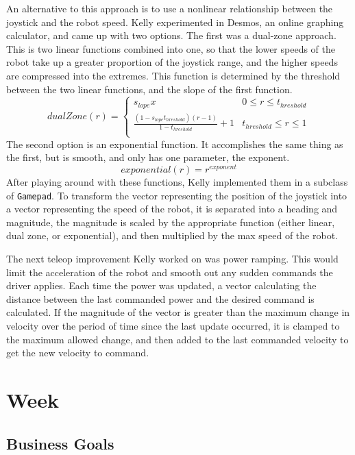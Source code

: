 \documentclass{article}
\begin{document}
An alternative to this approach is to use a nonlinear relationship between the joystick and the robot speed. Kelly experimented in Desmos, an online graphing calculator, and came up with two options. The first was a dual-zone approach. This is two linear functions combined into one, so that the lower speeds of the robot take up a greater proportion of the joystick range, and the higher speeds are compressed into the extremes. This function is determined by the threshold between the two linear functions, and the slope of the first function.
\begin{equation}
dualZone(r) = 
\begin{cases} 
      s_{lope}x & 0 \leq r \leq t_{hreshold}\\
      \frac{(1-s_{lope}t_{hreshold})(r-1)}{1-t_{hreshold}} +1& t_{hreshold} \leq r \leq 1 \\
  \end{cases}
\end{equation}
The second option is an exponential function. It accomplishes the same thing as the first, but is smooth, and only has one parameter, the exponent. 
\begin{equation}
    exponential(r) = r^{exponent}
\end{equation}
After playing around with these functions, Kelly implemented them in a subclass of \texttt{Gamepad}. To transform the vector representing the position of the joystick into a vector representing the speed of the robot, it is separated into a heading and magnitude, the magnitude is scaled by the appropriate function (either linear, dual zone, or exponential), and then multiplied by the max speed of the robot. 

The next teleop improvement Kelly worked on was power ramping. This would limit the acceleration of the robot and smooth out any sudden commands the driver applies. Each time the power was updated, a vector calculating the distance between the last commanded power and the desired command is calculated. If the magnitude of the vector is greater than the maximum change in velocity over the period of time since the last update occurred, it is clamped to the maximum allowed change, and then added to the last commanded velocity to get the new velocity to command. 
\clearpage \newpage \section{Week \thesection} 
\subsection{Business Goals}
\end{document}
